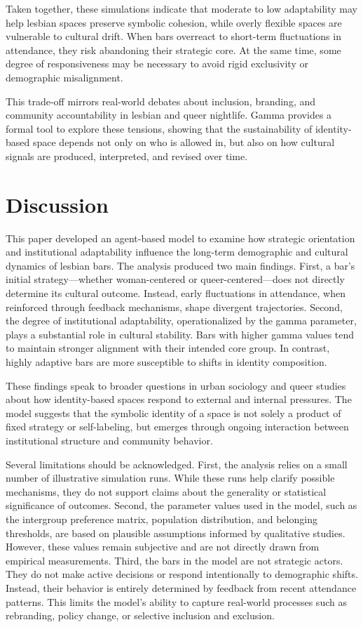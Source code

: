 \documentclass{article}
\begin{document}
Taken together, these simulations indicate that moderate to low adaptability may help lesbian spaces preserve symbolic cohesion, while overly flexible spaces are vulnerable to cultural drift. When bars overreact to short-term fluctuations in attendance, they risk abandoning their strategic core. At the same time, some degree of responsiveness may be necessary to avoid rigid exclusivity or demographic misalignment.

This trade-off mirrors real-world debates about inclusion, branding, and community accountability in lesbian and queer nightlife. Gamma provides a formal tool to explore these tensions, showing that the sustainability of identity-based space depends not only on who is allowed in, but also on how cultural signals are produced, interpreted, and revised over time.

\section{Discussion}

This paper developed an agent-based model to examine how strategic orientation and institutional adaptability influence the long-term demographic and cultural dynamics of lesbian bars. The analysis produced two main findings. First, a bar’s initial strategy—whether woman-centered or queer-centered—does not directly determine its cultural outcome. Instead, early fluctuations in attendance, when reinforced through feedback mechanisms, shape divergent trajectories. Second, the degree of institutional adaptability, operationalized by the gamma parameter, plays a substantial role in cultural stability. Bars with higher gamma values tend to maintain stronger alignment with their intended core group. In contrast, highly adaptive bars are more susceptible to shifts in identity composition.

These findings speak to broader questions in urban sociology and queer studies about how identity-based spaces respond to external and internal pressures. The model suggests that the symbolic identity of a space is not solely a product of fixed strategy or self-labeling, but emerges through ongoing interaction between institutional structure and community behavior.

Several limitations should be acknowledged. First, the analysis relies on a small number of illustrative simulation runs. While these runs help clarify possible mechanisms, they do not support claims about the generality or statistical significance of outcomes. Second, the parameter values used in the model, such as the intergroup preference matrix, population distribution, and belonging thresholds, are based on plausible assumptions informed by qualitative studies. However, these values remain subjective and are not directly drawn from empirical measurements. Third, the bars in the model are not strategic actors. They do not make active decisions or respond intentionally to demographic shifts. Instead, their behavior is entirely determined by feedback from recent attendance patterns. This limits the model’s ability to capture real-world processes such as rebranding, policy change, or selective inclusion and exclusion.
\end{document}
